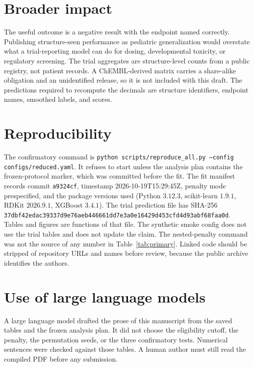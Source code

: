 \documentclass{article}
\begin{document}
\section*{Broader impact}

The useful outcome is a negative result with the endpoint named correctly.
Publishing structure-seen performance as pediatric generalization would overstate what a trial-reporting model can do for dosing, developmental toxicity, or regulatory screening.
The trial aggregates are structure-level counts from a public registry, not patient records.
A ChEMBL-derived matrix carries a share-alike obligation and an unidentified release, so it is not included with this draft.
The predictions required to recompute the decimals are structure identifiers, endpoint names, smoothed labels, and scores.

\section*{Reproducibility}

The confirmatory command is \texttt{python scripts/reproduce\_all.py --config configs/reduced.yaml}.
It refuses to start unless the analysis plan contains the frozen-protocol marker, which was committed before the fit.
The fit manifest records commit \texttt{a9324cf}, timestamp 2026-10-19T15:29:45Z, penalty mode prespecified, and the package versions used (Python $3.12.3$, scikit-learn $1.9.1$, RDKit $2026.9.1$, XGBoost $3.4.1$).
The trial prediction file has SHA-256 \texttt{37dbf42edac39337d9e76aeb446661dd7e3a0e16429d453cfd4d93abf68faa0d}.
Tables and figures are functions of that file.
The synthetic smoke config does not use the trial tables and does not update the claim.
The nested-penalty command was not the source of any number in Table~\ref{tab:primary}.
Linked code should be stripped of repository URLs and names before review, because the public archive identifies the authors.

\section*{Use of large language models}

A large language model drafted the prose of this manuscript from the saved tables and the frozen analysis plan.
It did not choose the eligibility cutoff, the penalty, the permutation seeds, or the three confirmatory tests.
Numerical sentences were checked against those tables.
A human author must still read the compiled PDF before any submission.
\end{document}
